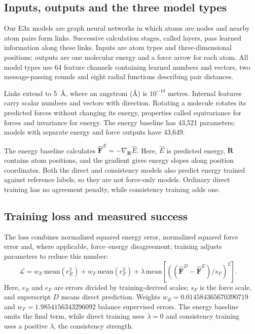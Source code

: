 \documentclass{article}
\begin{document}
\subsection{Inputs, outputs and the three model types}
Our E3x models are graph neural networks in which atoms are nodes and nearby atom pairs form links. Successive calculation stages, called layers, pass learned information along these links. Inputs are atom types and three-dimensional positions; outputs are one molecular energy and a force arrow for each atom. All model types use 64 feature channels containing learned numbers and vectors, two message-passing rounds and eight radial functions describing pair distances.

Links extend to 5~\AA, where an angstrom (\AA) is $10^{-10}$ metres. Internal features carry scalar numbers and vectors with direction. Rotating a molecule rotates its predicted forces without changing its energy, properties called equivariance for forces and invariance for energy. The energy baseline has 43,521 parameters; models with separate energy and force outputs have 43,649.

The energy baseline calculates $\widehat{\mathbf F}^{E}=-\nabla_{\mathbf R}\widehat E$. Here, $\widehat E$ is predicted energy, $\mathbf R$ contains atom positions, and the gradient gives energy slopes along position coordinates. Both the direct and consistency models also predict energy trained against reference labels, so they are not force-only models. Ordinary direct training has no agreement penalty, while consistency training adds one.
\subsection{Training loss and measured success}
The loss combines normalized squared energy error, normalized squared force error and, where applicable, force--energy disagreement; training adjusts parameters to reduce this number:
\begin{equation}
\mathcal L=w_E\,\mathrm{mean}(e_E^2)+w_F\,\mathrm{mean}(e_F^2)
+\lambda\,\mathrm{mean}\!\left[\left((\widehat{\mathbf F}^{D}-\widehat{\mathbf F}^{E})/s_F\right)^2\right].
\end{equation}
Here, $e_E$ and $e_F$ are errors divided by training-derived scales; $s_F$ is the force scale, and superscript $D$ means direct prediction. Weights $w_E=0.014584365670390719$ and $w_F=1.9854156343296092$ balance supervised errors. The energy baseline omits the final term, while direct training uses $\lambda=0$ and consistency training uses a positive $\lambda$, the consistency strength.
\end{document}
